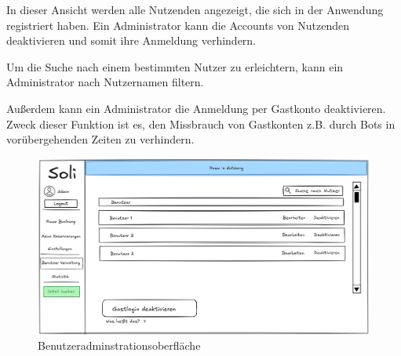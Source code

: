 In dieser Ansicht werden alle Nutzenden angezeigt, die sich in der Anwendung registriert haben.
Ein Administrator kann die Accounts von Nutzenden deaktivieren und somit ihre Anmeldung verhindern.

Um die Suche nach einem bestimmten Nutzer zu erleichtern, kann ein Administrator nach Nutzernamen filtern.

Außerdem kann ein Administrator die Anmeldung per Gastkonto deaktivieren.
Zweck dieser Funktion ist es, den Missbrauch von Gastkonten z.B. durch Bots in vorübergehenden Zeiten zu verhindern.
\clearpage
\begin{figure}[ht]
    \centering
    \includegraphics[scale=0.15]{figures/ui/useradminui}
    \caption{Benutzeradminstrationsoberfläche}
    \label{fig:adminuser}
\end{figure}

